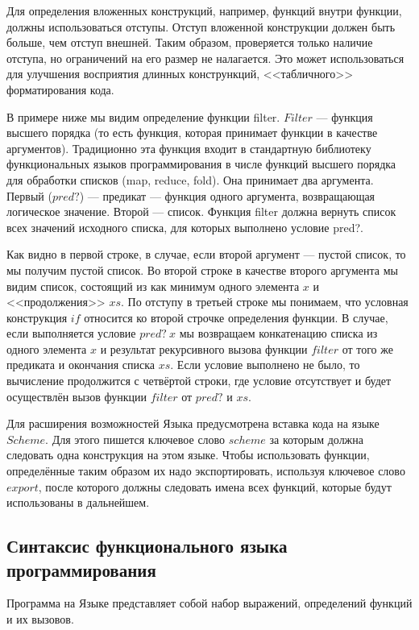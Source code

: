     Для определения вложенных конструкций, например, функций внутри функции, должны использоваться отступы.
    Отступ вложенной конструкции должен быть больше, чем отступ внешней.
    Таким образом, проверяется только наличие отступа, но ограничений на его размер не налагается.
    Это может использоваться для улучшения восприятия длинных констрункций, <<табличного>> форматирования кода.

    В примере ниже мы видим определение функции filter.
    $Filter$ --- функция высшего порядка (то есть функция, которая принимает функции в качестве аргументов).
    Традиционно эта функция входит в стандартную библиотеку функциональных языков программирования в числе функций высшего порядка для обработки списков (map, reduce, fold).
    Она принимает два аргумента.
    Первый ($pred?$) --- предикат --- функция одного аргумента, возвращающая логическое значение.
    Второй --- список.
    Функция filter должна вернуть список всех значений исходного списка, для которых выполнено условие pred?.

    Как видно в первой строке, в случае, если второй аргумент --- пустой список, то мы получим пустой список.
    Во второй строке в качестве второго аргумента мы видим список, состоящий из как минимум одного элемента $x$ и <<продолжения>> $xs$.
    По отступу в третьей строке мы понимаем, что условная конструкция $if$ относится ко второй строчке определения функции.
    В случае, если выполняется условие $pred?~x$ мы возвращаем конкатенацию списка из одного элемента $x$ и результат рекурсивного вызова функции $filter$ от того же предиката и окончания списка $xs$.
    Если условие выполнено не было, то вычисление продолжится с четвёртой строки, где условие отсутствует и будет осуществлён вызов функции $filter$ от $pred?$ и $xs$.

    

    Для расширения возможностей Языка предусмотрена вставка кода на языке $Scheme$.
    Для этого пишется ключевое слово $scheme$ за которым должна следовать одна конструкция на этом языке.
    Чтобы использовать функции, определённые таким образом их надо экспортировать, используя ключевое слово $export$, после которого должны следовать имена всех функций, которые будут использованы в дальнейшем.

    \subsection{Синтаксис функционального языка программирования}
        Программа на Языке представляет собой набор выражений, определений функций и их вызовов.
        
